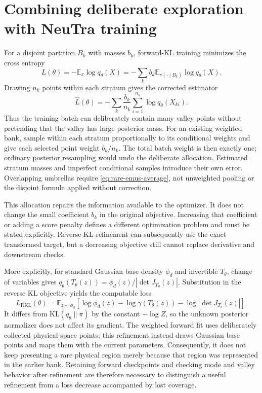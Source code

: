 \section[Deliberate exploration and NeuTra training]{Combining deliberate exploration with NeuTra training}

For a disjoint partition $B_k$ with masses $b_k$, forward-KL training minimizes
the cross entropy
\begin{equation}
 L(\theta)=-\mathbb E_\pi\log q_\theta(X)
 =-\sum_kb_k\mathbb E_{\pi(\cdot\mid B_k)}\log q_\theta(X).
 \label{eq:rare-stratified-training}
\end{equation}
Drawing $n_k$ points within each stratum gives the corrected estimator
\begin{equation}
 \widehat L(\theta)=-\sum_k\frac{b_k}{n_k}
     \sum_{i=1}^{n_k}\log q_\theta(X_{ki}).
 \label{eq:rare-stratified-estimator}
\end{equation}
Thus the training batch can deliberately contain many valley points without
pretending that the valley has large posterior mass. For an existing weighted
bank, sample within each stratum proportionally to its conditional weights
and give each selected point weight $b_k/n_k$. The total batch weight is then
exactly one; ordinary posterior resampling would undo the deliberate allocation.
Estimated stratum masses and imperfect conditional samples introduce their
own error. Overlapping umbrellas require \eqref{eq:rare-emus-average}, not
unweighted pooling or the disjoint formula applied without correction.

This allocation repairs the information available to the optimizer. It does
not change the small coefficient $b_k$ in the original objective. Increasing
that coefficient or adding a score penalty defines a different optimization
problem and must be stated explicitly. Reverse-KL refinement can subsequently
use the exact transformed target, but a decreasing objective still cannot
replace derivative and downstream checks.

More explicitly, for standard Gaussian base density $\phi_d$ and invertible
$T_\theta$, change of variables gives
$q_\theta(T_\theta(z))=\phi_d(z)/|\det J_{T_\theta}(z)|$. Substitution
in the reverse KL objective yields the computable loss
\begin{equation}
 L_{\mathrm{RKL}}(\theta)=\mathbb E_{z\sim\phi_d}\!\left[
  \log\phi_d(z)-\log\gamma(T_\theta(z))
  -\log|\det J_{T_\theta}(z)|\right].
 \label{eq:rare-rkl-refinement}
\end{equation}
It differs from $\mathrm{KL}(q_\theta\|\pi)$ by the constant
$-\log Z$, so the unknown posterior normalizer does not affect its gradient.
The weighted forward fit uses deliberately collected physical-space points;
this refinement instead draws Gaussian base points and maps them with the
current parameters. Consequently,
it does not keep presenting a rare physical region merely because that region
was represented in the earlier bank. Retaining forward checkpoints and checking
mode and valley behavior after refinement are therefore necessary to distinguish
a useful refinement from a loss decrease accompanied by lost coverage.

